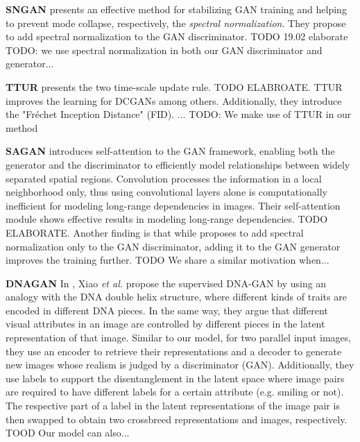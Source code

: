 \documentclass[12pt,a4paper]{article}
\begin{document}
\par \textbf{SNGAN} \cite{SNGAN} presents an effective method for stabilizing GAN training and helping to prevent mode collapse, respectively, the \textit{spectral normalization}. They propose to add spectral normalization to the GAN discriminator. TODO 19.02 elaborate
TODO: we use spectral normalization in both our GAN discriminator and generator...

\par \textbf{TTUR} \cite{TTUR} presents the two time-scale update rule. TODO ELABROATE. TTUR improves the learning for DCGANs among others.
Additionally, they introduce the "Fréchet Inception Distance" (FID). ...
TODO: We make use of TTUR in our method 

\par \textbf{SAGAN} \cite{SAGAN} introduces self-attention to the GAN framework, enabling both the generator and the discriminator to efficiently model relationships between widely separated spatial regions. Convolution processes the information in a local neighborhood only, thus using convolutional layers alone is computationally inefficient for modeling long-range dependencies in images. Their self-attention module shows effective results in modeling long-range dependencies. TODO ELABORATE.
Another finding is that while \cite{SNGAN} proposes to add spectral normalization only to the GAN discriminator, adding it to the GAN generator improves the training further. 
TODO We share a similar motivation when...

\par \textbf{DNAGAN} In \cite{DnaGan}, Xiao \textit{et al.} propose the supervised DNA-GAN by using an analogy with the DNA double helix structure, where different kinds of traits are encoded in different DNA pieces. In the same way, they argue that different visual attributes in an image are controlled by different pieces in the latent representation of that image. Similar to our model, for two parallel input images, they use an encoder to retrieve their representations and a decoder to generate new images whose realism is judged by a discriminator (GAN). Additionally, they use labels to support the disentanglement in the latent space where image pairs are required to have different labels for a certain attribute (e.g. smiling or not). The respective part of a label in the latent representations of the image pair is then swapped to obtain two crossbreed representations and images, respectively. TOOD Our model can also...
\end{document}
